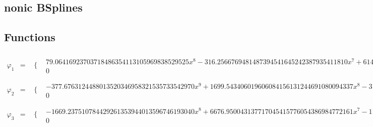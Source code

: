 \documentclass{article}
\begin{document}
 

\begin{landscape}
\section{nonic BSplines}
\subsection{Functions}\begin{eqnarray*} \varphi_1 & = & \begin{array}{cc}
 \{ & 
\begin{array}{cc}
 79.06416923703718486354113105969838529525 x^8-316.2566769481487394541645242387935411810 x^7+614.9435385102892156053199082420985522964 x^6-737.9322462123470587263838898905182627557 x^5+553.4491846592602940447879174178886970668 x^4-245.9774154041156862421279632968394209186 x^3+52.70944615802478990902742070646559019684 x^2 & x\geq 0\land x<1 \\
 0 & \text{True}
\end{array}

\end{array}\\
\varphi_2 & = & \begin{array}{cc}
 \{ & 
\begin{array}{cc}
 -377.6763124488013520346958321535733542970 x^9+1699.543406019606084156131244691080094337 x^8-3137.618595728503539980549990198917097237 x^7+3050.462523624933997203312490471169400091 x^6-1830.277514174960398321987494282701640055 x^5+915.1387570874801991609937471413508200274 x^4-406.7283364833245329604416653961559200122 x^3+87.15607210356954277723749972774769714547 x^2 & x\geq 0\land x<1 \\
 0 & \text{True}
\end{array}

\end{array}\\
\varphi_3 & = & \begin{array}{cc}
 \{ & 
\begin{array}{cc}
 -1669.237510784429261353944013596746193040 x^8+6676.950043137717045415776054386984772161 x^7-11563.68654443004758125755535360531502923 x^6+11321.73448230813308481744987046149838514 x^5-6575.283833475156804094374987447464051398 x^4+2070.785246764095019811405587577246361752 x^3-261.2618835203115033387571577762042453796 x^2 & x\geq 0\land x<1 \\
 0 & \text{True}
\end{array}


\end{array}
\end{eqnarray*}
\end{landscape}
\end{document}
